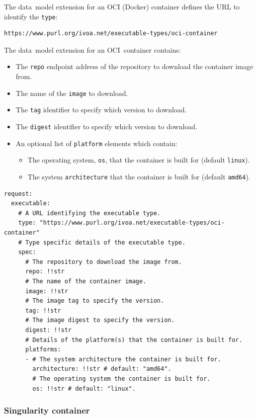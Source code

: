 \documentclass[11pt,a4paper]{ivoa}
\newcommand{\datamodel} {data~model}
\newcommand{\oci} {OCI}
\newcommand{\ocicontainer} {OCI~container}
\newcommand{\codeword}[1] {\texttt{#1}}
\begin{document}
The \datamodel{} extension for an \oci{} (Docker) container defines the URL
to identify the \codeword{type}:
\begin{lstlisting}[]
https://www.purl.org/ivoa.net/executable-types/oci-container
\end{lstlisting}
\hfill \break
The \datamodel{} extension for an \ocicontainer{} contains:
\begin{itemize}
    \item The \codeword{repo} endpoint address of the repository to download the container image from.
    \item The name of the \codeword{image} to download.
    \item The \codeword{tag} identifier to specify which version to download.
    \item The \codeword{digest} identifier to specify which version to download.
    \item An optional list of \codeword{platform} elements which contain:
    \begin{itemize}
        \item The operating system, \codeword{os}, that the container is built for (default \codeword{linux}).
        \item The system \codeword{architecture} that the container is built for (default \codeword{amd64}).
    \end{itemize}


\end{itemize}

\begin{lstlisting}[]
request:
  executable:
    # A URL identifying the executable type.
    type: "https://www.purl.org/ivoa.net/executable-types/oci-container"
    # Type specific details of the executable type.
    spec:
      # The repository to download the image from.
      repo: !!str
      # The name of the container image.
      image: !!str
      # The image tag to specify the version.
      tag: !!str
      # The image digest to specify the version.
      digest: !!str
      # Details of the platform(s) that the container is built for.
      platforms:
      - # The system architecture the container is built for.
        architecture: !!str # default: "amd64".
        # The operating system the container is built for.
        os: !!str # default: "linux".
\end{lstlisting}

\subsubsection{Singularity container}
\label{datamodel-singularity-container}
\end{document}
